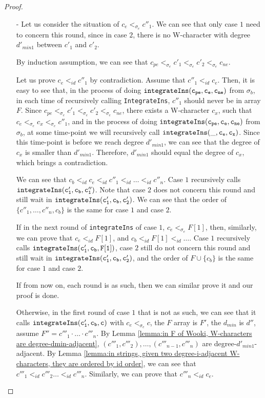 \begin {proof}
\begin{itemize}
    \begin{itemize}
    \setlength{\itemsep}{0.5pt}
    \item[-] Let us consider the situation of $c_e <_{\sigma_e} c''_1$. We can see that only case $1$ need to concern this round, since in case $2$, there is no W-character with degree $d'_{min1}$ between $c'_1$ and $c'_2$.

        By induction assumption, we can see that $c_{pe} <_{\sigma_e} c'_1 <_{\sigma_e} c'_2 <_{\sigma_e} c_{ne}$.

        Let us prove $c_e <_{id} c''_1$ by contradiction. Assume that $c''_1 <_{id} c_e$. Then, it is easy to see that, in the process of doing $\alabelshort[{\tt integrateIns}]{c_{pe},c_e,c_{ne}}$ from $\sigma_b$, in each time of recursively calling {\tt IntegrateIns}, $c''_1$ should never be in array $F$. Since $c_{pe} <_{\sigma_e} c'_1 <_{\sigma_e} c'_2 <_{\sigma_e} c_{ne}$, there exists a W-character $c_x$, such that $c_e <_{\sigma_e} c_x <_{\sigma_e} c''_1$, and in the process of doing $\alabelshort[{\tt integrateIns}]{c_{pe},c_e,c_{ne}}$ from $\sigma_b$, at some time-point we will recursively call $\alabelshort[{\tt integrateIns}]{\_,c_e,c_x}$. Since this time-point is before we reach degree $d'_{min1}$, we can see that the degree of $c_x$ is smaller than $d'_{min1}$. Therefore, $d'_{min1}$ should equal the degree of $c_x$, which brings a contradiction.

        We can see that $c_b <_{id} c_e <_{id} c''_1 <_{id} \ldots <_{id} c''_n$. Case $1$ recursively calls $\alabelshort[{\tt integrateIns}]{c'_1,c_b,c''_1}$. Note that case $2$ does not concern this round and still wait in $\alabelshort[{\tt integrateIns}]{c'_1,c_b,c'_2}$. We can see that the order of $\{ c''_1,\ldots,c''_n,c_b \}$ is the same for case $1$ and case $2$.

        If in the next round of {\tt integrateIns} of case $1$, $c_e <_{\sigma_e} F[1]$, then, similarly, we can prove that $c_e <_{id} F[1]$, and $c_b <_{id} F[1] <_{id}\ldots$. Case $1$ recursively calls $\alabelshort[{\tt integrateIns}]{c'_1,c_b,F[1]}$, case $2$ still do not concern this round and still wait in $\alabelshort[{\tt integrateIns}]{c'_1,c_b,c'_2}$, and the order of $F \cup \{ c_b \}$ is the same for case $1$ and case $2$.

        If from now on, each round is as such, then we can similar prove it and our proof is done.

        Otherwise, in the first round of case $1$ that is not as such, we can see that it calls $\alabelshort[{\tt integrateIns}]{c'_1,c_b,c}$ with $c_e <_{\sigma_e} c$, the $F$ array is $F'$, the $d_{min}$ is $d''$, assume $F'' = c'''_1 \cdot \ldots \cdot c'''_n$. By Lemma \ref{lemma:in F of Wooki, W-characters are degree-dmin-adjacent}, $(c'''_1,c'''_2),\ldots,(c'''_{n-1},c'''_n)$ are degree-$d'_{min1}$-adjacent. By Lemma \ref{lemma:in strings, given two degree-i-adjacent W-characters, they are ordered by id order}, we can see that $c'''_1 <_{id} c'''_2 \ldots <_{id} c'''_n$. Similarly, we can prove that $c'''_n <_{id} c_e$.


\end{itemize}
\end{itemize}
\end{proof}
